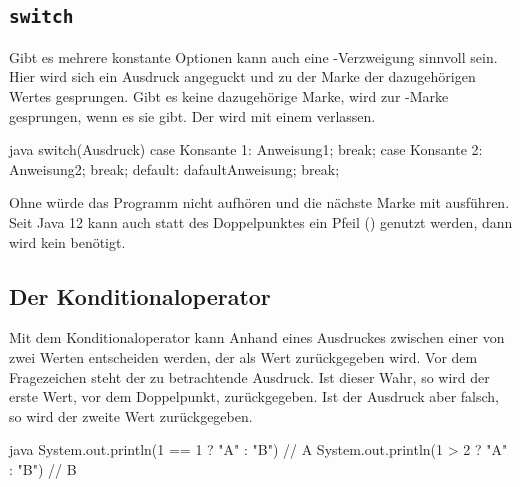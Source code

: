 \documentclass{article}
\begin{document}
\subsection{\texttt{switch}}
Gibt es mehrere konstante Optionen kann auch eine -Verzweigung sinnvoll sein. Hier wird sich ein Ausdruck angeguckt und zu der Marke der dazugehörigen Wertes gesprungen. Gibt es keine dazugehörige Marke, wird zur -Marke gesprungen, wenn es sie gibt. Der  wird mit einem  verlassen. 
\begin{sourcecode}{java}
switch(Ausdruck) {
case Konsante 1:
    Anweisung1;
    break;
case Konsante 2:
    Anweisung2;
    break;
default:
    dafaultAnweisung;
    break;
}
\end{sourcecode}
Ohne  würde das Programm nicht aufhören und die nächste Marke mit ausführen. Seit Java 12 kann auch statt des Doppelpunktes ein Pfeil (\ilsourcecode{->}) genutzt werden, dann wird kein  benötigt.

\subsection{Der Konditionaloperator}
Mit dem Konditionaloperator kann Anhand eines Ausdruckes zwischen einer von zwei Werten entscheiden werden, der als Wert zurückgegeben wird. Vor dem Fragezeichen steht der zu betrachtende Ausdruck. Ist dieser Wahr, so wird der erste Wert, vor dem Doppelpunkt, zurückgegeben. Ist der Ausdruck aber falsch, so wird der zweite Wert zurückgegeben.
\begin{sourcecode}{java}
System.out.println(1 == 1 ? "A" : "B") // A
System.out.println(1 > 2 ? "A" : "B") // B
\end{sourcecode}
\end{document}
